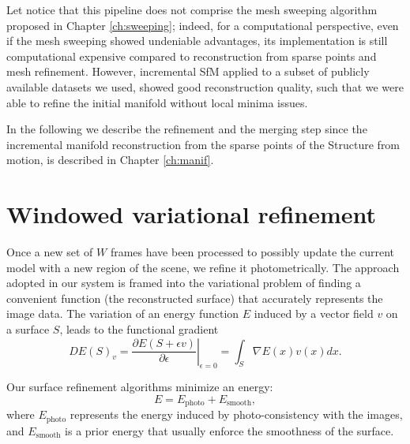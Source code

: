 Let notice that this pipeline does not comprise the mesh sweeping algorithm proposed in Chapter \ref{ch:sweeping}; indeed, for a computational perspective, even if the mesh sweeping showed undeniable advantages, its implementation is still computational expensive compared to reconstruction from sparse points and mesh refinement.
However, incremental SfM applied to a subset of publicly available datasets we used, showed good reconstruction quality, such that we were able to refine the initial manifold without local minima issues.

In the following we describe the refinement and the merging step since the incremental manifold reconstruction from the sparse points of the Structure from motion, is described in Chapter \ref{ch:manif}.

\section{Windowed variational refinement}
\label{sec:Incremental_photoconsistent}
Once a new set of $W$ frames have been processed to possibly update the current model with a new region of the scene, we refine it photometrically. 
The approach adopted in our system is framed into the variational problem of finding a convenient function (the reconstructed surface) that  accurately represents the image data.
The variation of an energy function $E$ induced by a vector field $v$ on a surface $\mathit{S}$, leads to the functional gradient
\begin{equation}
\label{eq::calculus}
 DE(\mathit{S})_v = \left.\frac{\partial E(\mathit{S} + \epsilon v)}{\partial \epsilon} \right|_{\epsilon=0} = \int_{\mathit{S}} \nabla E(x)v(x) dx.
\end{equation}

Our surface refinement algorithms minimize an energy:
\begin{equation}
\label{eq:en}
E = E_{\textrm{photo}} + E_{\textrm{smooth}} ,
\end{equation}
where  $E_{\textrm{photo}}$ represents the energy induced by photo-consistency with the images, and $E_{\textrm{smooth}}$ is a prior energy that usually enforce the smoothness of the surface.  

